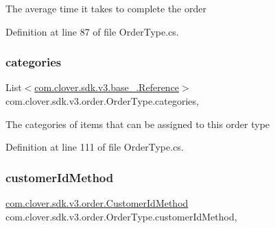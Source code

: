 The average time it takes to complete the order 



Definition at line 87 of file Order\+Type.\+cs.

\mbox{\label{classcom_1_1clover_1_1sdk_1_1v3_1_1order_1_1_order_type_a53f9c84cac095eb9b387d90ce38e7a79}} 
\subsubsection{\texorpdfstring{categories}{categories}}
{\footnotesize\ttfamily List$<$\hyperlink{classcom_1_1clover_1_1sdk_1_1v3_1_1base___1_1_reference}{com.\+clover.\+sdk.\+v3.\+base\+\_\+.\+Reference}$>$ com.\+clover.\+sdk.\+v3.\+order.\+Order\+Type.\+categories\hspace{0.3cm}{\ttfamily [get]}, {\ttfamily [set]}}



The categories of items that can be assigned to this order type 



Definition at line 111 of file Order\+Type.\+cs.

\mbox{\label{classcom_1_1clover_1_1sdk_1_1v3_1_1order_1_1_order_type_a063b2f005d99c92308c43f3e71710d8a}} 
\subsubsection{\texorpdfstring{customer\+Id\+Method}{customerIdMethod}}
{\footnotesize\ttfamily \hyperlink{namespacecom_1_1clover_1_1sdk_1_1v3_1_1order_afc10d003bf89af56702a924943b43e70}{com.\+clover.\+sdk.\+v3.\+order.\+Customer\+Id\+Method} com.\+clover.\+sdk.\+v3.\+order.\+Order\+Type.\+customer\+Id\+Method\hspace{0.3cm}{\ttfamily [get]}, {\ttfamily [set]}}



